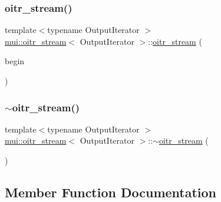 \mbox{\label{classmui_1_1oitr__stream_aadb5539d92ab1188615cda0d187feae9}} 
\subsubsection{\texorpdfstring{oitr\+\_\+stream()}{oitr\_stream()}\hspace{0.1cm}{\footnotesize\ttfamily [2/2]}}
{\footnotesize\ttfamily template$<$typename Output\+Iterator $>$ \\
\hyperlink{classmui_1_1oitr__stream}{mui\+::oitr\+\_\+stream}$<$ Output\+Iterator $>$\+::\hyperlink{classmui_1_1oitr__stream}{oitr\+\_\+stream} (\begin{DoxyParamCaption}\item[{Output\+Iterator}]{begin }\end{DoxyParamCaption})\hspace{0.3cm}{\ttfamily [inline]}}

\mbox{\label{classmui_1_1oitr__stream_a5d50d06cd1c0a473c614eaa32648fba4}} 
\subsubsection{\texorpdfstring{$\sim$oitr\+\_\+stream()}{~oitr\_stream()}}
{\footnotesize\ttfamily template$<$typename Output\+Iterator $>$ \\
\hyperlink{classmui_1_1oitr__stream}{mui\+::oitr\+\_\+stream}$<$ Output\+Iterator $>$\+::$\sim$\hyperlink{classmui_1_1oitr__stream}{oitr\+\_\+stream} (\begin{DoxyParamCaption}{ }\end{DoxyParamCaption})\hspace{0.3cm}{\ttfamily [inline]}}



\subsection{Member Function Documentation}
\mbox{\label{classmui_1_1oitr__stream_a8ee33091cd47f94182e3843a5d5d2649}} 
